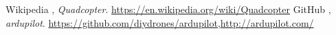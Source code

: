 \begin{thebibliography}{9}

  Wikipedia ,
  \emph{Quadcopter}.
  \url{https://en.wikipedia.org/wiki/Quadcopter}
  GitHub ,
  \emph{ardupilot}.
  \url{https://github.com/diydrones/ardupilot},\url{http://ardupilot.com/}

\end{thebibliography}
